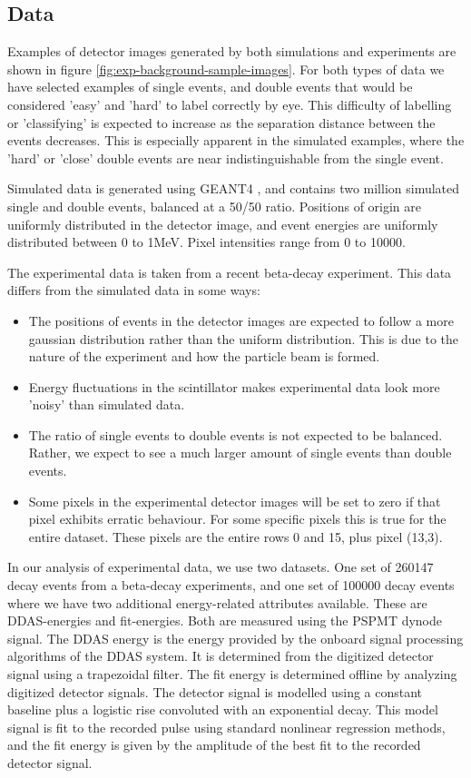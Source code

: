 \subsection{Data}\label{sec:experimental-background-data}
Examples of detector images generated by both simulations and experiments
are shown in figure \ref{fig:exp-background-sample-images}. For both types
of data we have selected examples of single events, and double events that
would be considered 'easy' and 'hard' to label correctly by eye. This difficulty
of labelling or 'classifying' is expected to increase as the separation distance
between the events decreases. This is especially apparent in the simulated
examples, where the 'hard' or 'close' double events are near indistinguishable
from the single event. 

Simulated data is generated using GEANT4 \cite{Agostinelli2003}, and contains
two million simulated single and double events, balanced at a 50/50 ratio. 
Positions of origin are uniformly distributed in the detector image, and 
event energies are uniformly distributed between 0 to 1MeV. Pixel intensities 
range from 0 to 10000.

The experimental data is taken from a recent beta-decay experiment. This data differs
from the simulated data in some ways:
\begin{itemize}
	\item The positions of events in the detector images are expected to follow a more
	gaussian distribution rather than the uniform distribution. This is due to the
	nature of the experiment and how the particle beam is formed.
	\item Energy fluctuations in the scintillator makes experimental data look more
	'noisy' than simulated data.
	\item The ratio of single events to double events is not expected to be balanced.
	Rather, we expect to see a much larger amount of single events than double events.
	\item Some pixels in the experimental detector images will be set to zero if that
	pixel exhibits erratic behaviour. For some specific pixels this is true for the
	entire dataset. These pixels are the entire rows 0 and 15, plus pixel (13,3).
\end{itemize}
In our analysis of experimental data, we use two datasets. One set of 260147 decay events from a beta-decay
experiments, and one set of 100000 decay events where we have two additional energy-related
attributes available. These are DDAS\cite{msu-ddas}-energies and fit-energies. 
Both are measured using the PSPMT dynode signal. The DDAS energy is the energy
provided by the onboard signal processing algorithms of the DDAS system.
It is determined from the digitized detector signal using a trapezoidal filter.
The fit energy is determined offline by analyzing digitized detector signals.
The detector signal is modelled using a constant baseline plus a logistic rise 
convoluted with an exponential decay. This model signal is fit to the recorded
pulse using standard nonlinear regression methods, and the fit energy is given by the
amplitude of the best fit to the recorded detector signal.

